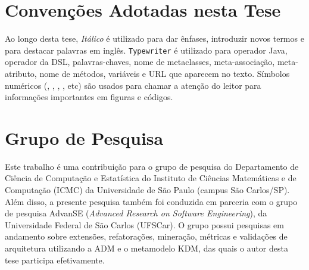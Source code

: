     
\section{Convenções Adotadas nesta Tese}\label{sec:convencoes}

Ao longo desta tese, \textit{Itálico} é utilizado para dar ênfases, introduzir novos termos e para destacar palavras em inglês. \texttt{Typewriter} é utilizado para operador Java, operador da DSL, palavras-chaves, nome de metaclasses, meta-associação, meta-atributo, nome de métodos, variáveis e URL que aparecem no texto. Símbolos numéricos (, , , , etc) são usados para chamar a atenção do leitor para informações importantes em figuras e códigos.

\section{Grupo de Pesquisa}

Este trabalho é uma contribuição para o grupo de pesquisa do Departamento de Ciência de Computação e Estatística do Instituto de Ciências Matemáticas e de Computação (ICMC) da Universidade de São Paulo (campus São Carlos/SP). Além disso, a presente pesquisa também foi conduzida em parceria com o grupo de pesquisa AdvanSE (\textit{Advanced Research on Software Engineering}), da Universidade Federal de São Carlos (UFSCar). O grupo possui pesquisas em andamento sobre extensões, refatorações, mineração, métricas e validações de arquitetura utilizando a ADM e o metamodelo KDM, das quais o autor desta tese participa efetivamente.

